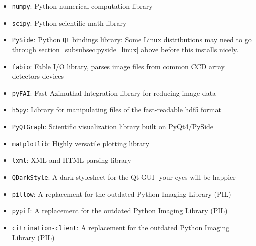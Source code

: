 \begin{itemize}
\item \verb|numpy|: Python numerical computation library
\item \verb|scipy|: Python scientific math library
\item \verb|PySide|: Python \verb|Qt| bindings library: 
    Some Linux distributions may need to go through section~\ref{subsubsec:pyside_linux} above
    before this installs nicely.
\item \verb|fabio|: Fable I/O library, parses image files from common CCD array detectors devices
\item \verb|pyFAI|: Fast Azimuthal Integration library for reducing image data
\item \verb|h5py|: Library for manipulating files of the fast-readable hdf5 format
\item \verb|PyQtGraph|: Scientific visualization library built on PyQt4/PySide
\item \verb|matplotlib|: Highly versatile plotting library 
\item \verb|lxml|: XML and HTML parsing library 
\item \verb|QDarkStyle|: A dark stylesheet for the Qt GUI- your eyes will be happier
\item \verb|pillow|: A replacement for the outdated Python Imaging Library (PIL)
\item \verb|pypif|: A replacement for the outdated Python Imaging Library (PIL)
\item \verb|citrination-client|: A replacement for the outdated Python Imaging Library (PIL)
\end{itemize}



